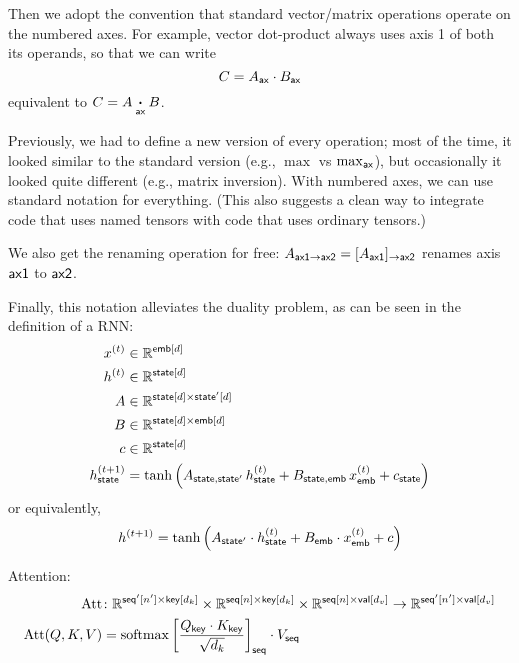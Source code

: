 Then we adopt the convention that standard vector/matrix operations operate on the numbered axes. For example, vector dot-product always uses axis 1 of both its operands, so that we can write
\begin{equation*}
C = A_{\mathsf{ax}} \cdot B_{\mathsf{ax}}
\end{equation*}
equivalent to $C = A \mathbin{\mathop{\boldsymbol\cdot}\limits_{\mathsf{ax}}} B$. 

Previously, we had to define a new version of every operation; most of the time, it looked similar to the standard version (e.g., $\max$ vs $\max_{\mathsf{ax}}$), but occasionally it looked quite different (e.g., matrix inversion). With numbered axes, we can use standard notation for everything.
(This also suggests a clean way to integrate code that uses named tensors with code that uses ordinary tensors.)

We also get the renaming operation for free: $A_{\mathsf{ax1}\rightarrow\mathsf{ax2}} = [A_{\mathsf{ax1}}]_{\rightarrow\mathsf{ax2}}$ renames axis $\mathsf{ax1}$ to $\mathsf{ax2}$.

Finally, this notation alleviates the duality problem, as can be seen in the definition of a RNN:
\begin{align*}
x^{(t)} &\in \mathbb{R}^{\mathsf{emb}[d]} \\
h^{(t)} &\in \mathbb{R}^{\mathsf{state}[d]} \\
A &\in \mathbb{R}^{\mathsf{state}[d] \times \mathsf{state'}[d]} \\
B &\in \mathbb{R}^{\mathsf{state}[d] \times \mathsf{emb}[d]} \\
c &\in \mathbb{R}^{\mathsf{state}[d]} \\
h^{(t+1)}_{\mathsf{state}} &= \tanh\left( A_{\mathsf{state},\mathsf{state'}} \, h^{(t)}_{\mathsf{state}} + B_{\mathsf{state},\mathsf{emb}} \, x^{(t)}_{\mathsf{emb}} + c_{\mathsf{state}} \right)
\end{align*}
or equivalently,
\begin{equation*}
h^{(t+1)} = \tanh\left( A_{\mathsf{state'}} \cdot h^{(t)}_{\mathsf{state}} + B_{\mathsf{emb}} \cdot x^{(t)}_{\mathsf{emb}} + c \right)
\end{equation*}

Attention:
\begin{align*}
  \text{Att} &\colon \mathbb{R}^{\mathsf{seq'}[n'] \times\mathsf{key}[d_k]} \times \mathbb{R}^{\mathsf{seq}[n] \times\mathsf{key}[d_k]} \times \mathbb{R}^{\mathsf{seq}[n] \times\mathsf{val}[d_v]} \rightarrow \mathbb{R}^{\mathsf{seq'}[n'] \times\mathsf{val}[d_v]} \\
  \text{Att}(Q,K,V) &= \operatorname*{softmax} \left[ \frac{Q_{\mathsf{key}} \cdot K_{\mathsf{key}}}{\sqrt{d_k}} \right]_{\mathsf{seq}} \cdot V_{\mathsf{seq}}
\end{align*}

